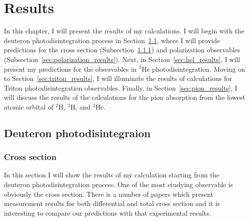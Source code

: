 \chapter{Results}\label{chap:results}


    In this chapter, I will present the results of my calculations. I will begin with the deuteron photodisintegration process in Section~\ref{sec:de_results}, where I will provide predictions for the cross section (Subsection~\ref{sec:cross_results}) and polarization observables (Subsection~\ref{sec:polarization_results}).
    Next, in Section~\ref{sec:hel_results}, I will present my predictions for 
    the observables in $^3$He photodisintegration.
    Moving on to Section~\ref{sec:triton_results}, I will illuminate the results of calculations for
    Triton photodisintegration observables.
    Finally, in Section~\ref{sec:pion_results}, I will discuss the results of the calculations for
    the pion absorption from the lowest atomic orbital of $^2$H, $^3$H, and $^3$He.

\section{Deuteron photodisintegraion}
\label{sec:de_results}
    \subsection{Cross section}
    \label{sec:cross_results}

    In this section I will show the results of my calculation starting from the
    deuteron photodisintegration process. One of the most
    studying observable is obviously the cross section. There is
    a number of papers which present 
    measurement results for both differential and total cross section
    \cite{BOSMAN1979,ARENDS1984,Skopik1974, Moreh1989, Birenbaum1985, Bernabei1986, rachek2007,Ying_Experiment_Deut, DeSanctis_Experiment_Deut} 
    and it is interesting to compare 
    our predictions with that experimental results.

